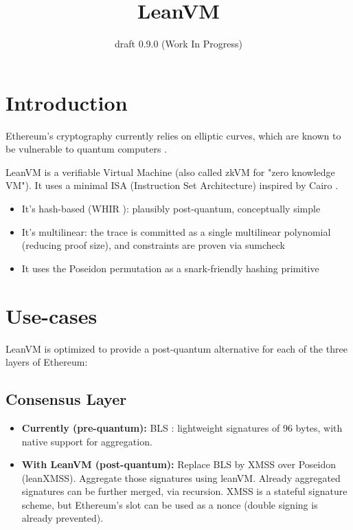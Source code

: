 \documentclass{article}
\title{LeanVM}
\author{draft 0.9.0 (Work In Progress)}
\date{}
\theoremstyle{definition}
\begin{document}
\maketitle

\tableofcontents
\newpage

\section{Introduction}
Ethereum's cryptography currently relies on elliptic curves, which are known to be vulnerable to quantum computers \cite{shor}.

LeanVM is a verifiable Virtual Machine (also called zkVM for "zero knowledge VM"). It uses a minimal ISA (Instruction Set Architecture) inspired by Cairo \cite{cairo}.
\begin{itemize}
    \item It's hash-based (WHIR \cite{whir}): plausibly post-quantum, conceptually simple
    \item It's multilinear: the trace is committed as a single multilinear polynomial (reducing proof size), and constraints are proven via sumcheck \cite{sumcheck}
    \item It uses the Poseidon \cite{poseidon1} permutation as a snark-friendly hashing primitive
\end{itemize}

\section{Use-cases}

LeanVM is optimized to provide a post-quantum alternative for each of the three layers of Ethereum:

\subsection{Consensus Layer}
\begin{itemize}
    \item \textbf{Currently (pre-quantum):} BLS \cite{bls}: lightweight signatures of 96 bytes, with native support for aggregation.
    \item \textbf{With LeanVM (post-quantum):} Replace BLS by XMSS over Poseidon \cite{ethereum_signatures} (leanXMSS). Aggregate those signatures using leanVM. Already aggregated signatures can be further merged, via recursion. XMSS is a stateful signature scheme, but Ethereum's slot can be used as a nonce (double signing is already prevented).
\end{itemize}
\end{document}
